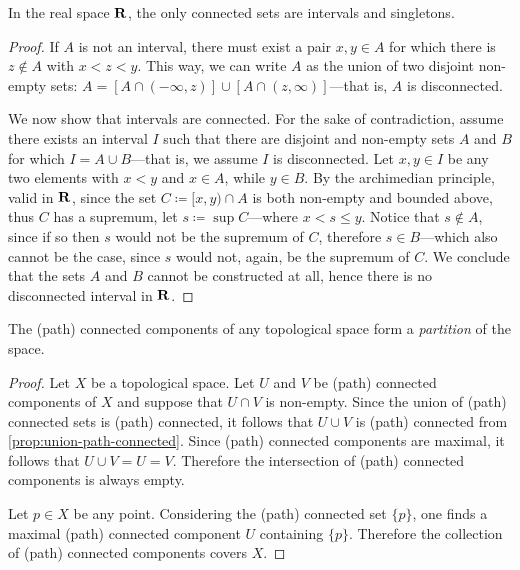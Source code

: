 \begin{theorem}
\label{thm:connected-interval-real-space}
In the real space \(\mathbf{R}\), the only connected sets are intervals and singletons.
\end{theorem}

\begin{proof}
If \(A\) is not an interval, there must exist a pair \(x, y \in A\) for which
there is \(z \notin A\) with \(x < z < y\). This way, we can write \(A\) as the
union of two disjoint non-empty sets:
\(A = [A \cap (-\infty, z)] \cup [A \cap (z, \infty)]\)---that is, \(A\) is
disconnected.

We now show that intervals are connected. For the sake of contradiction, assume
there exists an interval \(I\) such that there are disjoint and non-empty sets
\(A\) and \(B\) for which \(I = A \cup B\)---that is, we assume \(I\) is
disconnected. Let \(x, y \in I\) be any two elements with \(x < y\) and
\(x \in A\), while \(y \in B\). By the archimedian principle, valid in \(\mathbf{R}\),
since the set \(C \coloneq [x, y) \cap A\) is both non-empty and bounded above,
thus \(C\) has a supremum, let \(s \coloneq \sup C\)---where \(x < s \leq
y\). Notice that \(s \notin A\), since if so then \(s\) would not be the
supremum of \(C\), therefore \(s \in B\)---which also cannot be the case,
since \(s\) would not, again, be the supremum of \(C\). We conclude that the
sets \(A\) and \(B\) cannot be constructed at all, hence there is no
disconnected interval in \(\mathbf{R}\).
\end{proof}

\begin{proposition}
\label{prop:connected-components-partition}
The (path) connected components of any topological space form a \emph{partition}
of the space.
\end{proposition}

\begin{proof}
Let \(X\) be a topological space. Let \(U\) and \(V\) be (path) connected
components of \(X\) and suppose that \(U \cap V\) is non-empty. Since the union
of (path) connected sets is (path) connected, it follows that \(U \cup V\) is
(path) connected from \cref{prop:union-path-connected}. Since (path) connected
components are maximal, it follows that \(U \cup V = U = V\). Therefore the
intersection of (path) connected components is always empty.

Let \(p \in X\) be any point. Considering the (path) connected set \(\{p\}\),
one finds a maximal (path) connected component \(U\) containing
\(\{p\}\). Therefore the collection of (path) connected components covers \(X\).
\end{proof}

